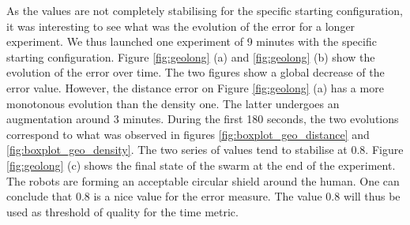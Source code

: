 \documentclass[oneside, a4paper, 12pt]{memoir}
\begin{document}
				As the values are not completely stabilising for the specific starting configuration, it was interesting to see what was the evolution of the error for a longer experiment. We thus launched one experiment of 9 minutes with the specific starting configuration. Figure \ref{fig:geolong} (a) and \ref{fig:geolong} (b) show the evolution of the error over time. The two figures show a global decrease of the error value. However, the distance error on Figure \ref{fig:geolong} (a) has a more monotonous evolution than the density one. The latter undergoes an augmentation around 3 minutes. During the first 180 seconds, the two evolutions correspond to what was observed in figures \ref{fig:boxplot_geo_distance} and \ref{fig:boxplot_geo_density}. The two series of values tend to stabilise at 0.8. Figure \ref{fig:geolong} (c) shows the final state of the swarm at the end of the experiment. The robots are forming an acceptable circular shield around the human. One can conclude that 0.8 is a nice value for the error measure. The value 0.8 will thus be used as threshold of quality for the time metric.
				
\end{document}
